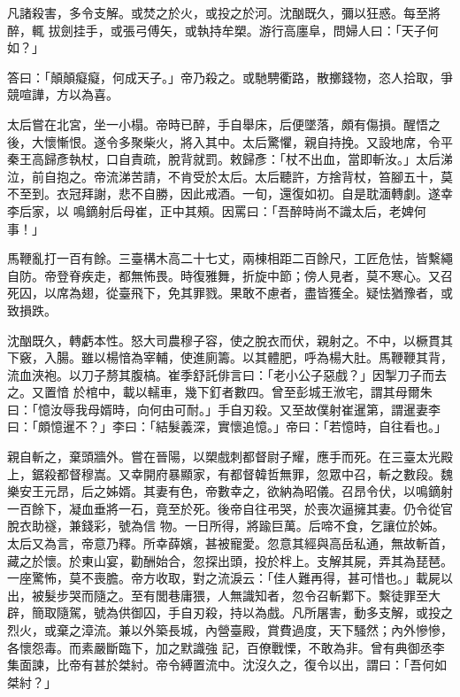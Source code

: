 \begin{pinyinscope}
 凡諸殺害，多令支解。或焚之於火，或投之於河。沈酗既久，彌以狂惑。每至將醉，輒
 拔劍挂手，或張弓傅矢，或執持牟槊。游行高廛阜，問婦人曰：「天子何如？」



 答曰：「顛顛癡癡，何成天子。」帝乃殺之。或馳騁衢路，散擲錢物，恣人拾取，爭競喧譁，方以為喜。



 太后嘗在北宮，坐一小榻。帝時已醉，手自舉床，后便墜落，頗有傷損。醒悟之後，大懷慚恨。遂令多聚柴火，將入其中。太后驚懼，親自持挽。又設地席，令平秦王高歸彥執杖，口自責疏，脫背就罰。敕歸彥：「杖不出血，當即斬汝。」太后涕泣，前自抱之。帝流涕苦請，不肯受於太后。太后聽許，方捨背杖，笞腳五十，莫不至到。衣冠拜謝，悲不自勝，因此戒酒。一旬，還復如初。自是耽湎轉劇。遂幸李后家，以
 鳴鏑射后母崔，正中其頰。因罵曰：「吾醉時尚不識太后，老婢何事！」



 馬鞭亂打一百有餘。三臺構木高二十七丈，兩棟相距二百餘尺，工匠危怯，皆繫繩自防。帝登脊疾走，都無怖畏。時復雅舞，折旋中節；傍人見者，莫不寒心。又召死囚，以席為翅，從臺飛下，免其罪戮。果敢不慮者，盡皆獲全。疑怯猶豫者，或致損跌。



 沈酗既久，轉虧本性。怒大司農穆子容，使之脫衣而伏，親射之。不中，以橛貫其下竅，入腸。雖以楊愔為宰輔，使進廁籌。以其體肥，呼為楊大肚。馬鞭鞭其背，流血浹袍。以刀子剺其腹槁。崔季舒託俳言曰：「老小公子惡戲？」因掣刀子而去之。又置愔
 於棺中，載以轜車，幾下釘者數四。曾至彭城王浟宅，謂其母爾朱曰：「憶汝辱我母婿時，向何由可耐。」手自刃殺。又至故僕射崔暹第，謂暹妻李曰：「頗憶暹不？」李曰：「結髮義深，實懷追憶。」帝曰：「若憶時，自往看也。」



 親自斬之，棄頭牆外。嘗在晉陽，以槊戲刺都督尉子耀，應手而死。在三臺太光殿上，鋸殺都督穆嵩。又幸開府暴顯家，有都督韓哲無罪，忽眾中召，斬之數段。魏樂安王元昂，后之姊婿。其妻有色，帝數幸之，欲納為昭儀。召昂令伏，以鳴鏑射一百餘下，凝血垂將一石，竟至於死。後帝自往弔哭，於喪次逼擁其妻。仍令從官脫衣助襚，兼錢彩，號為信
 物。一日所得，將踰巨萬。后啼不食，乞讓位於姊。太后又為言，帝意乃釋。所幸薛嬪，甚被寵愛。忽意其經與高岳私通，無故斬首，藏之於懷。於東山宴，勸酬始合，忽探出頭，投於柈上。支解其屍，弄其為琵琶。一座驚怖，莫不喪膽。帝方收取，對之流淚云：「佳人難再得，甚可惜也。」載屍以出，被髮步哭而隨之。至有閭巷庸猥，人無識知者，忽令召斬鄴下。繫徒罪至大辟，簡取隨駕，號為供御囚，手自刃殺，持以為戲。凡所屠害，動多支解，或投之烈火，或棄之漳流。兼以外築長城，內營臺殿，賞費過度，天下騷然；內外慘慘，各懷怨毒。而素嚴斷臨下，加之默識強
 記，百僚戰慄，不敢為非。曾有典御丞李集面諫，比帝有甚於桀紂。帝令縛置流中。沈沒久之，復令以出，謂曰：「吾何如桀紂？」




\end{pinyinscope}
